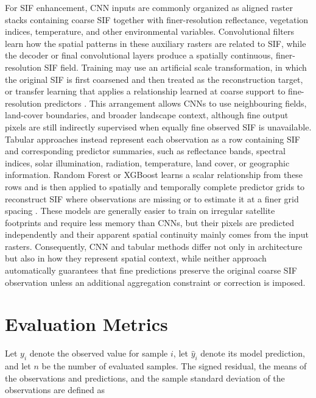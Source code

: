 For SIF enhancement, CNN inputs are commonly organized as aligned raster stacks containing coarse SIF together with finer-resolution reflectance, vegetation indices, temperature, and other environmental variables. Convolutional filters learn how the spatial patterns in these auxiliary rasters are related to SIF, while the decoder or final convolutional layers produce a spatially continuous, finer-resolution SIF field. Training may use an artificial scale transformation, in which the original SIF is first coarsened and then treated as the reconstruction target, or transfer learning that applies a relationship learned at coarse support to fine-resolution predictors \cite{gensheimer2022convolutional,du2025cnsif}. This arrangement allows CNNs to use neighbouring fields, land-cover boundaries, and broader landscape context, although fine output pixels are still indirectly supervised when equally fine observed SIF is unavailable. Tabular approaches instead represent each observation as a row containing SIF and corresponding predictor summaries, such as reflectance bands, spectral indices, solar illumination, radiation, temperature, land cover, or geographic information. Random Forest or XGBoost learns a scalar relationship from these rows and is then applied to spatially and temporally complete predictor grids to reconstruct SIF where observations are missing or to estimate it at a finer grid spacing \cite{ma2020generation,chen2022long,he2025tracking,chen2025improved}. These models are generally easier to train on irregular satellite footprints and require less memory than CNNs, but their pixels are predicted independently and their apparent spatial continuity mainly comes from the input rasters. Consequently, CNN and tabular methods differ not only in architecture but also in how they represent spatial context, while neither approach automatically guarantees that fine predictions preserve the original coarse SIF observation unless an additional aggregation constraint or correction is imposed.

\section{Evaluation Metrics}

Let \(y_i\) denote the observed value for sample \(i\), let \(\widehat{y}_i\) denote its model prediction, and let \(n\) be the number of evaluated samples. The signed residual, the means of the observations and predictions, and the sample standard deviation of the observations are defined as

